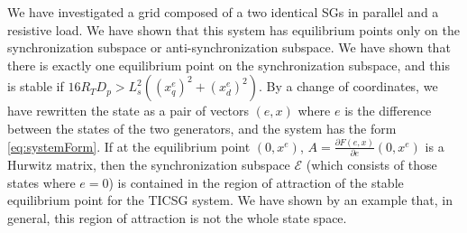\documentclass[letterpaper,10pt,conference]{ieeeconf}
\begin{document}
We have investigated a grid composed of a two identical SGs in
parallel and a resistive load. We have shown that this system has
equilibrium points only on the synchronization subspace or
anti-synchronization subspace. We have shown that there is exactly one
equilibrium point on the synchronization subspace, and this is stable
if $16 R_T D_p>L_s^2\left(\left(x_q^e\right)^2+\left(x_d^e\right)^2
\right)$. By a change of coordinates, we have rewritten the state as a
pair of vectors $(e,x)$ where $e$ is the difference between the states
of the two generators, and the system has the form 
\eqref{eq:systemForm}. If at the equilibrium point $(0,x^e)$,
$A=\frac{\partial F(e,x)}{\partial e}\left(0,x^e\right)$ is a Hurwitz
matrix, then the synchronization subspace $\mathscr{E}$ (which
consists of those states where $e=0$) is contained in the region of
attraction of the stable equilibrium point for the TICSG system. We
have shown by an example that, in general, this region of attraction
is not the whole state space.
\end{document}
